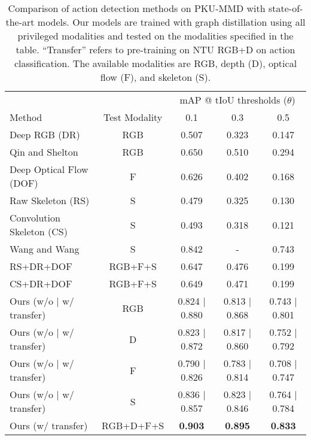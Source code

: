\begin{table}[t]
\centering
\scriptsize
\caption{Comparison of action detection methods on PKU-MMD with state-of-the-art models. Our models are trained with graph distillation using all privileged modalities
and tested on the modalities specified in the table. ``Transfer'' refers to pre-training on NTU RGB+D on action classification. The available modalities are RGB, depth (D), optical flow (F), and skeleton (S).}
\label{pku_state_of_the_art}
\begin{tabular}{l@{\hskip 0.1in}c@{\hskip 0.1in}c@{\hskip 0.1in}c@{\hskip 0.1in}c}
\toprule
\multicolumn{2}{c}{} & \multicolumn{3}{c}{mAP @ tIoU thresholds ($\theta$)} \\
\cmidrule(r){3-5}
Method & Test Modality & 0.1 & 0.3 & 0.5 \\ 
\midrule
Deep RGB (DR) \cite{pku_mmd} & RGB & 0.507 & 0.323 & 0.147 \\
Qin and Shelton \cite{pku_result_qin} & RGB & 0.650 & 0.510 & 0.294 \\
Deep Optical Flow (DOF) \cite{pku_mmd} & F & 0.626 & 0.402 & 0.168 \\
Raw Skeleton (RS) \cite{pku_mmd} & S & 0.479 & 0.325 & 0.130 \\
Convolution Skeleton (CS) \cite{pku_mmd} & S & 0.493 & 0.318 & 0.121 \\
Wang and Wang \cite{pku_result_wang_workshop} & S & 0.842 & - & 0.743 \\
RS+DR+DOF \cite{pku_mmd} & RGB+F+S & 0.647 & 0.476 & 0.199 \\
CS+DR+DOF \cite{pku_mmd} & RGB+F+S & 0.649 & 0.471 & 0.199 \\
\midrule
Ours (w/o $|$ w/ transfer) & RGB & 0.824 $|$ 0.880 & 0.813 $|$ 0.868 & 0.743 $|$ 0.801 \\
Ours (w/o $|$ w/ transfer) & D   & 0.823 $|$ 0.872 & 0.817 $|$ 0.860 & 0.752 $|$ 0.792 \\
Ours (w/o $|$ w/ transfer) & F   & 0.790 $|$ 0.826 & 0.783 $|$ 0.814 & 0.708 $|$ 0.747 \\
Ours (w/o $|$ w/ transfer) & S   & 0.836 $|$ 0.857 & 0.823 $|$ 0.846 & 0.764 $|$ 0.784 \\
Ours (w/ transfer) & RGB+D+F+S & \bf{0.903} & \bf{0.895} & \bf{0.833} \\
\bottomrule
\end{tabular}
\end{table}




